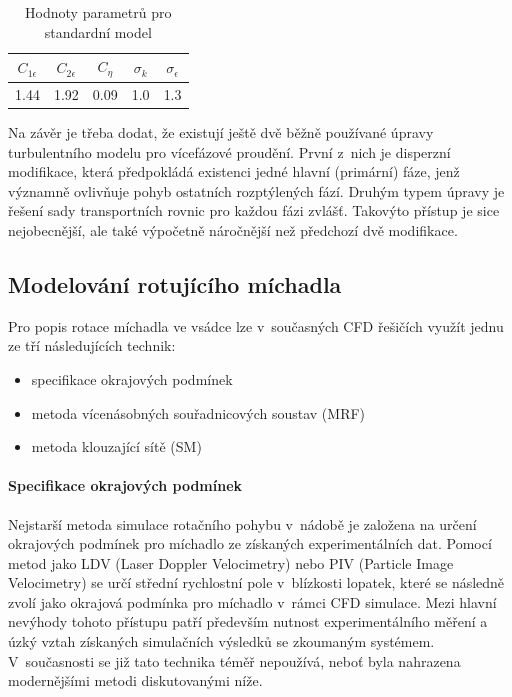 \begin{table}[h!]
\centering
\caption{Hodnoty parametrů pro standardní \keps{} model}
\label{tab:const}
\begin{tabular}{ccccc}
\toprule
$C_{1\epsilon}$ & $C_{2\epsilon}$ & $C_{\eta}$ &  $\sigma_{k}$ & $\sigma_{\epsilon}$\\
\midrule
\num{1.44} & \num{1.92} & \num{0.09} & \num{1.0} & \num{1.3} \\
\bottomrule
\end{tabular}
\end{table}

Na závěr je třeba dodat, že existují ještě dvě běžně používané úpravy \keps{} turbulentního modelu pro vícefázové proudění. První z~nich je disperzní modifikace, která předpokládá existenci jedné hlavní (primární) fáze, jenž významně ovlivňuje pohyb ostatních rozptýlených fází. Druhým typem úpravy je řešení sady transportních rovnic \keps{} pro každou fázi zvlášť. Takovýto přístup je sice nejobecnější, ale také výpočetně náročnější než předchozí dvě modifikace. 

\subsection{Modelování rotujícího míchadla}
Pro popis rotace míchadla ve vsádce lze v~současných CFD řešičích využít jednu ze tří následujících technik:
\begin{itemize}[itemsep=0pt,parsep=0pt,partopsep=0pt,topsep=0pt]
  \item specifikace okrajových podmínek
  \item metoda vícenásobných souřadnicových soustav (MRF) 
  \item metoda klouzající sítě (SM) 
\end{itemize} 

\paragraph{Specifikace okrajových podmínek}
Nejstarší metoda simulace rotačního pohybu v~nádobě je založena na určení okrajových podmínek pro míchadlo ze získaných experimentálních  dat. Pomocí metod jako LDV (Laser Doppler Velocimetry) nebo PIV (Particle Image Velocimetry) se určí střední rychlostní pole v~blízkosti lopatek, které se následně zvolí jako okrajová podmínka pro míchadlo v~rámci CFD simulace. Mezi hlavní nevýhody tohoto přístupu patří především  nutnost experimentálního měření a úzký vztah získaných simulačních výsledků se zkoumaným systémem. V~současnosti se již tato technika téměř nepoužívá, neboť byla nahrazena modernějšími metodi diskutovanými níže.

